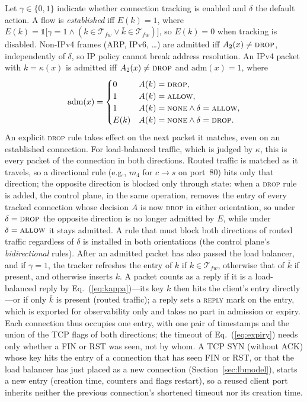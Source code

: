 \documentclass[conference]{IEEEtran}
\begin{document}
Let $\gamma\in\{0,1\}$ indicate whether connection tracking is enabled and
$\delta$ the default action. A flow is \emph{established} iff $E(k)=1$, where
$E(k) = \mathbb{1}\big[\gamma = 1 \land (k \in \mathcal{T}_{fw} \lor \bar k \in
\mathcal{T}_{fw})\big]$, so $E(k)=0$ when tracking is disabled. Non-IPv4
frames (ARP, IPv6, \dots) are admitted iff $A_2(x) \ne \textsc{drop}$,
independently of $\delta$, so IP policy cannot break address resolution. An
IPv4 packet with $k=\kappa(x)$ is admitted iff $A_2(x) \ne \textsc{drop}$ and
$\mathrm{adm}(x)=1$, where
\begin{equation}
\mathrm{adm}(x) =
\begin{cases}
0 & A(k) = \textsc{drop},\\
1 & A(k) = \textsc{allow},\\
1 & A(k) = \textsc{none} \land \delta=\textsc{allow},\\
E(k) & A(k) = \textsc{none} \land \delta = \textsc{drop}.
\end{cases}
\label{eq:adm}
\end{equation}
An explicit \textsc{drop} rule takes effect on the next packet it matches,
even on an established connection. For load-balanced traffic, which is judged
by $\kappa$, this is every packet of the connection in both directions. Routed
traffic is matched as it travels, so a directional rule (e.g., $m_4$ for
$c\to s$ on port~80) hits only that direction; the opposite direction is
blocked only through state: when a \textsc{drop} rule is added, the control
plane, in the same operation, removes the entry of every tracked connection whose
decision $A$ is now \textsc{drop} in either orientation, so under
$\delta=\textsc{drop}$ the opposite direction is no longer admitted by $E$,
while under $\delta=\textsc{allow}$ it stays admitted. A rule that must block
both directions of routed traffic regardless of $\delta$ is installed in both
orientations (the control plane's \emph{bidirectional} rules). After an admitted
packet has also passed the load balancer, and if $\gamma=1$, the tracker
refreshes the entry of $k$ if $k\in\mathcal{T}_{fw}$, otherwise that of $\bar
k$ if present, and otherwise inserts $k$. A packet counts as a reply if it is
a load-balanced reply by Eq.~(\ref{eq:kappa})---its key $k$ then hits the
client's entry directly---or if only $\bar k$ is present (routed traffic);
a reply sets a \textsc{reply} mark on the entry, which is exported for
observability only and takes no part in admission or expiry. Each connection
thus occupies one entry, with one pair of timestamps and the union of the TCP
flags of both directions; the timeout of Eq.~(\ref{eq:expiry}) needs only
whether a FIN or RST was seen, not by whom. A TCP SYN (without ACK) whose key
hits the entry of a connection that has seen FIN or RST, or that the load
balancer has just placed as a new connection (Section~\ref{sec:lbmodel}),
starts a new entry (creation time, counters and flags restart), so a reused
client port inherits neither the previous connection's shortened timeout nor
its creation time.
\end{document}
